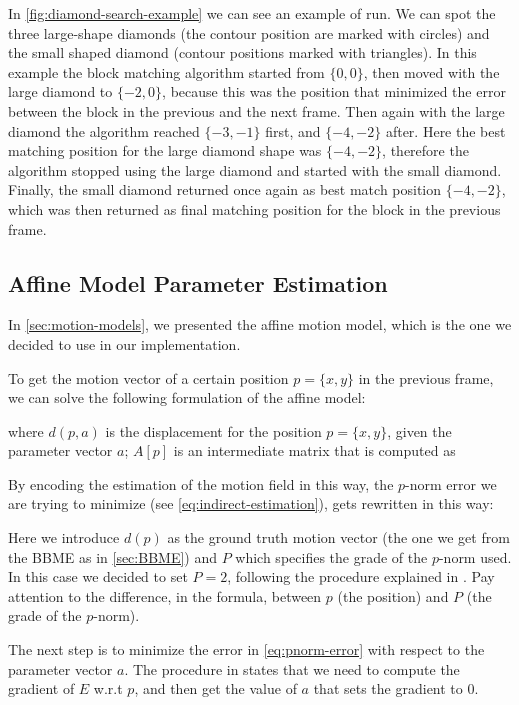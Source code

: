 In \cref{fig:diamond-search-example} we can see an example of run. We can spot the three large-shape diamonds (the contour position are marked with circles) and the small shaped diamond (contour positions marked with triangles).
In this example the block matching algorithm started from $\{0,0\}$, then moved with the large diamond to $\{-2,0\}$, because this was the position that minimized the error between the block in the previous and the next frame. Then again with the large diamond the algorithm reached $\{-3,-1\}$ first, and $\{-4,-2\}$ after. Here the best matching position for the large diamond shape was $\{-4,-2\}$, therefore the algorithm stopped using the large diamond and started with the small diamond. Finally, the small diamond returned once again as best match position $\{-4,-2\}$, which was then returned as final matching position for the block in the previous frame.

\subsection{Affine Model Parameter Estimation}
In \cref{sec:motion-models}, we presented the affine motion model, which is the one we decided to use in our implementation.

To get the motion vector of a certain position $p=\{x,y\}$ in the previous frame, we can solve the following formulation of the affine model:

where $d(p, a)$ is the displacement for the position $p = \{x,y\}$, given the parameter vector $a$; $A[p]$ is an intermediate matrix that is computed as 


By encoding the estimation of the motion field in this way, the $p$-norm error we are trying to minimize (see \cref{eq:indirect-estimation}), gets rewritten in this way:


Here we introduce $d(p)$ as the ground truth motion vector (the one we get from the BBME as in \cref{sec:BBME}) and $P$ which specifies the grade of the $p$-norm used. In this case we decided to set $P=2$, following the procedure explained in \cite{WangBook}. Pay attention to the difference, in the formula, between $p$ (the position) and $P$ (the grade of the $p$-norm). 

The next step is to minimize the error in \cref{eq:pnorm-error} with respect to the parameter vector $a$.
The procedure in \cite{WangBook} states that we need to compute the gradient of $E$ w.r.t $p$, and then get the value of $a$ that sets the gradient to 0.

